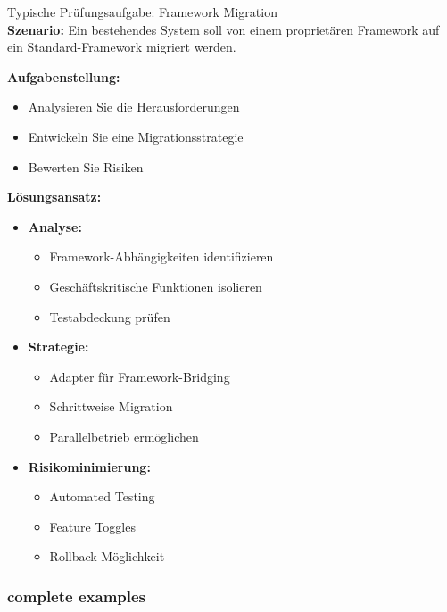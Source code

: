 \begin{example2}{Typische Prüfungsaufgabe: Framework Migration}\\
\textbf{Szenario:}
Ein bestehendes System soll von einem proprietären Framework auf ein Standard-Framework 
migriert werden.

\textbf{Aufgabenstellung:}
\begin{itemize}
    \item Analysieren Sie die Herausforderungen
    \item Entwickeln Sie eine Migrationsstrategie
    \item Bewerten Sie Risiken
\end{itemize}

\textbf{Lösungsansatz:}
\begin{itemize}
    \item \textbf{Analyse:}
    \begin{itemize}
        \item Framework-Abhängigkeiten identifizieren
        \item Geschäftskritische Funktionen isolieren
        \item Testabdeckung prüfen
    \end{itemize}
    
    \item \textbf{Strategie:}
    \begin{itemize}
        \item Adapter für Framework-Bridging
        \item Schrittweise Migration
        \item Parallelbetrieb ermöglichen
    \end{itemize}
    
    \item \textbf{Risikominimierung:}
    \begin{itemize}
        \item Automated Testing
        \item Feature Toggles
        \item Rollback-Möglichkeit
    \end{itemize}
\end{itemize}
\end{example2}









\subsubsection{complete examples}

